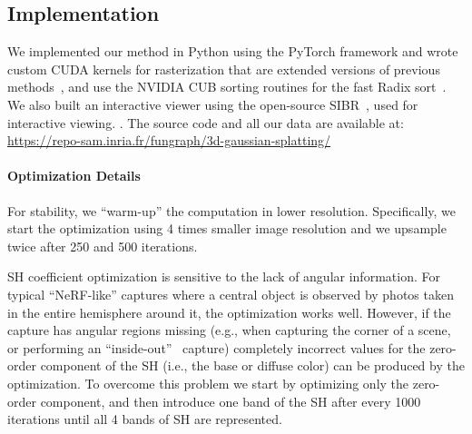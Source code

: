 \subsection{Implementation}
\label{sec:impl}


We implemented our method in Python using the PyTorch framework and wrote custom CUDA kernels for rasterization that are extended versions of previous methods~\cite{kopanas21}, and use the NVIDIA CUB sorting routines for the fast Radix sort~\cite{merrill2010revisiting}.
We also built an interactive viewer using the open-source SIBR~\cite{sibr2020}, used for interactive viewing. .
The source code and all our data are available at: \textcolor{blue}{\url{https://repo-sam.inria.fr/fungraph/3d-gaussian-splatting/}}


\paragraph{Optimization Details}
For stability, we ``warm-up'' the computation in lower resolution. 
Specifically, we start the optimization using 4 times smaller image resolution and we upsample twice after 250 and 500 iterations. 

SH coefficient optimization is sensitive to the lack of angular information. For typical ``NeRF-like''
captures where a central object is observed by photos taken in the entire hemisphere around it, the optimization works well. However, if the capture has angular regions missing (e.g., when capturing the corner of a scene, or performing an ``inside-out''~\cite{HRDB16} capture) completely incorrect values for the zero-order component of the SH (i.e., the base or diffuse color) can be produced by the optimization. 
To overcome this problem we start by optimizing only the zero-order component, and then introduce one band of the SH after every 1000 iterations until all 4 bands of SH are represented. %


